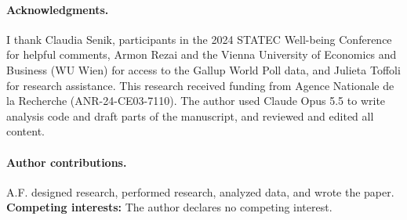 \documentclass[10pt]{article}
\begin{document}
\paragraph{Acknowledgments.} I thank Claudia Senik, %
participants in the 2024 STATEC Well-being Conference for helpful comments, Armon Rezai and the Vienna University of Economics and Business (WU Wien) for access to the Gallup World Poll data, and Julieta Toffoli for research assistance. This research received funding from Agence Nationale de la Recherche (ANR-24-CE03-7110). The author used Claude Opus 5.5 to write analysis code and draft parts of the manuscript, and reviewed and edited all content.

\paragraph{Author contributions.} A.F. designed research, performed research, analyzed data, and wrote the paper. \textbf{Competing interests:} The author declares no competing interest.


\end{document}
